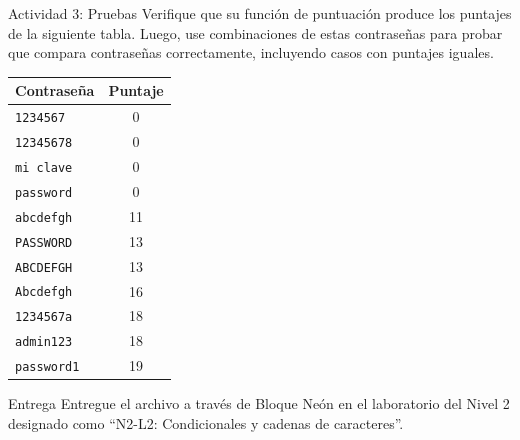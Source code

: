 \documentclass{ip-lab}
\begin{document}
\pagebreak

\begin{sectionbox}{Actividad 3: Pruebas}
Verifique que su función de puntuación produce los puntajes de la siguiente tabla. Luego, use combinaciones de estas contraseñas para probar que compara contraseñas correctamente, incluyendo casos con puntajes iguales.

\begin{center}
  \begin{tabular}{lc}
    \toprule
    \textbf{Contraseña}  & \textbf{Puntaje} \\
    \midrule
    \texttt{1234567}     & 0                \\
    \texttt{12345678}    & 0                \\
    \texttt{mi clave}    & 0                \\
    \texttt{password}    & 0                \\
    \texttt{abcdefgh}    & 11               \\
    \texttt{PASSWORD}    & 13               \\
    \texttt{ABCDEFGH}    & 13               \\
    \texttt{Abcdefgh}    & 16               \\
    \texttt{1234567a}    & 18               \\
    \texttt{admin123}    & 18               \\
    \texttt{password1}   & 19               \\
    \bottomrule
  \end{tabular}
\end{center}
\end{sectionbox}

\begin{sectionbox}{Entrega}
Entregue el archivo a través de Bloque Neón en el laboratorio del Nivel 2 designado como ``N2-L2: Condicionales y cadenas de caracteres''.
\end{sectionbox}
\end{document}
